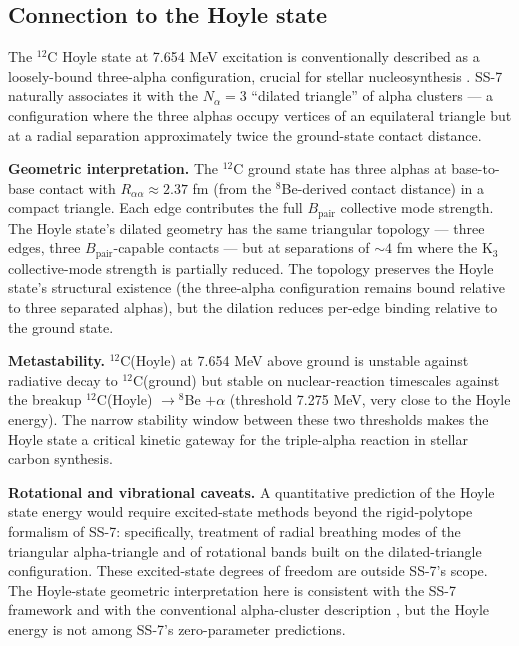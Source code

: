\documentclass[11pt,letterpaper]{article}
\newcommand{\Bpair}{B_{\mathrm{pair}}}
\newcommand{\Nalpha}{N_{\alpha}}
\begin{document}
\subsection{Connection to the Hoyle state}

The ${}^{12}$C Hoyle state at 7.654 MeV excitation is conventionally described as a loosely-bound three-alpha configuration, crucial for stellar nucleosynthesis \cite{hoyle1954, freer_alpha}. SS-7 naturally associates it with the $\Nalpha = 3$ ``dilated triangle'' of alpha clusters --- a configuration where the three alphas occupy vertices of an equilateral triangle but at a radial separation approximately twice the ground-state contact distance.

\textbf{Geometric interpretation.} The ${}^{12}$C ground state has three alphas at base-to-base contact with $R_{\alpha\alpha} \approx 2.37$ fm (from the ${}^8$Be-derived contact distance) in a compact triangle. Each edge contributes the full $\Bpair$ collective mode strength. The Hoyle state's dilated geometry has the same triangular topology --- three edges, three $\Bpair$-capable contacts --- but at separations of $\sim 4$ fm where the K$_3$ collective-mode strength is partially reduced. The topology preserves the Hoyle state's structural existence (the three-alpha configuration remains bound relative to three separated alphas), but the dilation reduces per-edge binding relative to the ground state.

\textbf{Metastability.} ${}^{12}$C(Hoyle) at 7.654 MeV above ground is unstable against radiative decay to ${}^{12}$C(ground) but stable on nuclear-reaction timescales against the breakup ${}^{12}$C(Hoyle) $\to {}^8$Be $+ \alpha$ (threshold 7.275 MeV, very close to the Hoyle energy). The narrow stability window between these two thresholds makes the Hoyle state a critical kinetic gateway for the triple-alpha reaction in stellar carbon synthesis.

\textbf{Rotational and vibrational caveats.} A quantitative prediction of the Hoyle state energy would require excited-state methods beyond the rigid-polytope formalism of SS-7: specifically, treatment of radial breathing modes of the triangular alpha-triangle and of rotational bands built on the dilated-triangle configuration. These excited-state degrees of freedom are outside SS-7's scope. The Hoyle-state geometric interpretation here is consistent with the SS-7 framework and with the conventional alpha-cluster description \cite{freer_alpha, funaki2003}, but the Hoyle energy is not among SS-7's zero-parameter predictions.
\end{document}
